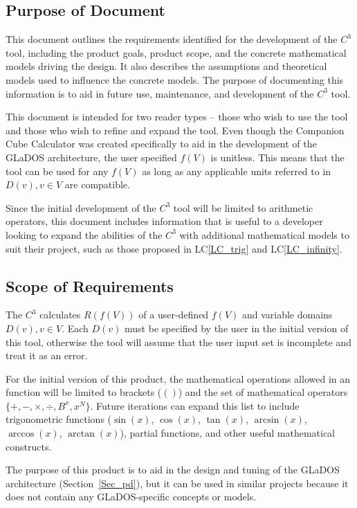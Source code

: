 \documentclass[12pt]{article}
\newcommand{\lcref}[1]{LC\ref{#1}}
\newcommand{\progname}{Companion Cube Calculator} %
\newcommand{\prognameAbbrv}{$C^{3}$}
\begin{document}
\subsection{Purpose of Document}
This document outlines the requirements identified for the development of the 
\prognameAbbrv{} tool, including the product goals, product scope, and the 
concrete mathematical models driving the design. It also describes the 
assumptions and theoretical models used to influence the concrete models. The 
purpose of documenting this information is to aid in future use, maintenance, 
and development of the \prognameAbbrv{} tool.

This document is intended for two reader types -- those who wish to use the 
tool and those who wish to refine and expand the tool. Even though the 
\progname{} was created specifically to aid in the development of the GLaDOS 
architecture, the user specified $f(V)$ is unitless. This means that the tool 
can be used for any $f(V)$ as long as any applicable units referred to in 
$D(v), v \in V$ are compatible.

Since the initial development of the \prognameAbbrv{} tool will be limited to 
arithmetic operators, this document includes information that is useful to a 
developer looking to expand the abilities of the \prognameAbbrv{} with 
additional mathematical models to suit their project, such as those proposed in 
\lcref{LC_trig} and \lcref{LC_infinity}. 

\subsection{Scope of Requirements} 
The \prognameAbbrv{} calculates $R(f(V))$ of a user-defined $f(V)$ and variable 
domains $D(v), v \in V$. Each $D(v)$ must be specified by the user in the 
initial version of this tool, otherwise the tool will assume that the user 
input set is incomplete and treat it as an error.

For the initial version of this product, the mathematical operations allowed in 
an function will be limited to brackets ($()$) and the set of mathematical 
operators $\{+, -, \times, \div, B^x, x^N\}$. Future iterations can expand this 
list to include trigonometric functions ($\sin(x)$, $\cos(x)$, $\tan(x)$, 
$\arcsin(x)$, $\arccos(x)$, $\arctan(x)$), partial functions, and other useful 
mathematical constructs.

The purpose of this product is to aid in the design and tuning of the GLaDOS 
architecture (Section~\ref{Sec_pd}), but it can be used in similar projects 
because it does not contain any GLaDOS-specific concepts or models.
\end{document}

